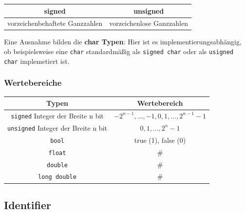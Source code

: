 \documentclass[a4paper]{report}
\begin{document}
\begin{center}
\begin{tabular}{c|c}
	\textbf{signed} & \textbf{unsigned} \\ \hline
	vorzeichenbehaftete Ganzzahlen & vorzeichenlose Ganzzahlen
\end{tabular}
\end{center}
 
Eine Ausnahme bilden die \textbf{char Typen}: Hier ist es implementierungsabhängig, ob beispielsweise eine \texttt{char} standardmäßig als \texttt{signed char} oder als \texttt{usigned char} implemetiert ist.

\subsubsection{Wertebereiche}

\begin{center}
\begin{tabular}{|c|c|}
	\hline
	\textbf{Typen}	& \textbf{Wertebereich} \\ \hline
	\texttt{signed} Integer der Breite n bit & $-2^{n-1}, \dots , -1,0,1, \dots ,2^{n-1}-1$ \\ 
	\texttt{unsigned} Integer der Breite n bit & $0,1, \dots ,2^{n}-1$ \\\hline
	\texttt{bool} & true (1), false (0) \\ \hline
	\texttt{float} & \#\\%
	\texttt{double} &\#\\
	\texttt{long double} & \#\\ \hline
	
\end{tabular}
\end{center}
\subsection{Identifier}
\end{document}
